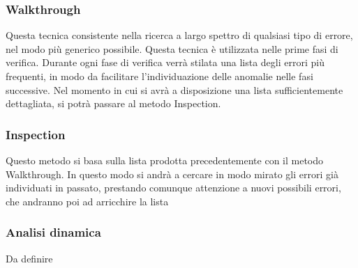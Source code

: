		\subsubsection{Walkthrough}
		Questa tecnica consistente nella ricerca a largo spettro di qualsiasi tipo di errore, nel modo più generico possibile. 
		Questa tecnica è utilizzata nelle prime fasi di verifica. Durante ogni fase di verifica verrà stilata una lista degli errori più frequenti, in modo da facilitare l’individuazione delle anomalie nelle fasi successive. 
		Nel momento in cui si avrà a disposizione una lista sufficientemente dettagliata, si potrà passare al metodo Inspection.
		
		
		\subsubsection{Inspection}
		Questo metodo si basa sulla lista prodotta precedentemente con il metodo Walkthrough. In questo modo si andrà a cercare in modo mirato gli errori già individuati in passato, prestando comunque attenzione a nuovi possibili errori, che andranno poi ad arricchire la lista
		
		
		\subsubsection{Analisi dinamica}
		Da definire
		
		
	
